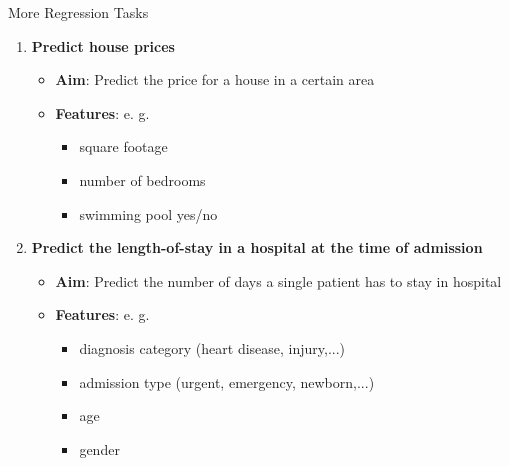 \documentclass[11pt,compress,t,notes=noshow, xcolor=table]{beamer}
\begin{document}

\begin{vbframe}{More Regression Tasks}

\begin{enumerate}

  \item \textbf{Predict house prices}
  
  \medskip
  
  \begin{itemize}
  
    \item \textbf{Aim}: Predict the price for a house in a certain area
    \item \textbf{Features}: e. g.
    
    \begin{itemize}
    
      \item square footage
      \item number of bedrooms
      \item swimming pool yes/no
      
    \end{itemize}
    
  \end{itemize}
  
  \item \textbf{Predict the length-of-stay in a hospital at the time of 
  admission}
  
  \begin{itemize}
  
    \item \textbf{Aim}: Predict the number of days a single patient has to stay 
    in hospital
    \item \textbf{Features}: e. g.
    
    \begin{itemize}
    
      \item diagnosis category (heart disease, injury,...)
      \item admission type (urgent, emergency, newborn,...)
      \item age
      \item gender
      
    \end{itemize}
    
  \end{itemize}
  
\end{enumerate}

\end{vbframe}
\end{document}
